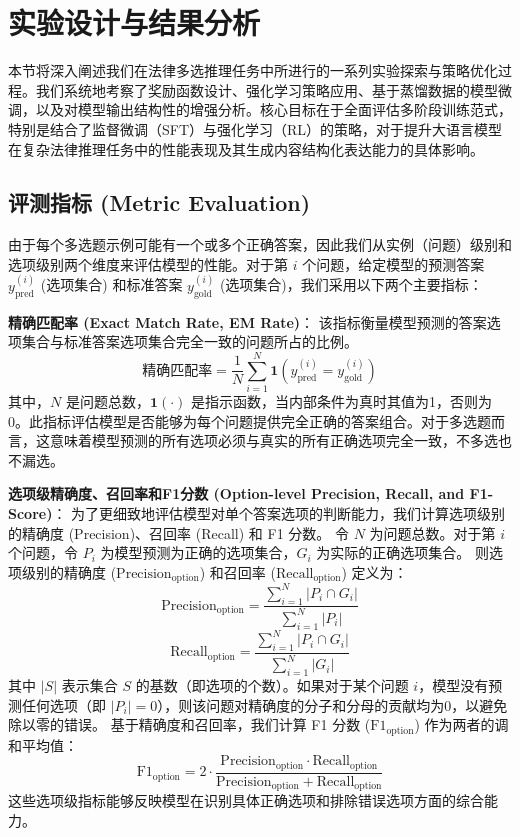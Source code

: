 \documentclass{pkuthesis}
\begin{document}
\section{实验设计与结果分析}
\label{sec:experiments_results}

本节将深入阐述我们在法律多选推理任务中所进行的一系列实验探索与策略优化过程。我们系统地考察了奖励函数设计、强化学习策略应用、基于蒸馏数据的模型微调，以及对模型输出结构性的增强分析。核心目标在于全面评估多阶段训练范式，特别是结合了监督微调（SFT）与强化学习（RL）的策略，对于提升大语言模型在复杂法律推理任务中的性能表现及其生成内容结构化表达能力的具体影响。

\subsection{评测指标 (Metric Evaluation)}
\label{sec:metrics}
由于每个多选题示例可能有一个或多个正确答案，因此我们从实例（问题）级别和选项级别两个维度来评估模型的性能。对于第 $i$ 个问题，给定模型的预测答案 $y^{(i)}_{\text{pred}}$ (选项集合) 和标准答案 $y^{(i)}_{\text{gold}}$ (选项集合)，我们采用以下两个主要指标：

\textbf{精确匹配率 (Exact Match Rate, EM Rate)}：
该指标衡量模型预测的答案选项集合与标准答案选项集合完全一致的问题所占的比例。
$$ \text{精确匹配率} = \frac{1}{N} \sum_{i=1}^{N} \mathbf{1}(y^{(i)}_{\text{pred}} = y^{(i)}_{\text{gold}}) $$
其中，$N$ 是问题总数，$\mathbf{1}(\cdot)$ 是指示函数，当内部条件为真时其值为1，否则为0。此指标评估模型是否能够为每个问题提供完全正确的答案组合。对于多选题而言，这意味着模型预测的所有选项必须与真实的所有正确选项完全一致，不多选也不漏选。

\textbf{选项级精确度、召回率和F1分数 (Option-level Precision, Recall, and F1-Score)}：
为了更细致地评估模型对单个答案选项的判断能力，我们计算选项级别的精确度 (Precision)、召回率 (Recall) 和 F1 分数。
令 $N$ 为问题总数。对于第 $i$ 个问题，令 $P_i$ 为模型预测为正确的选项集合，$G_i$ 为实际的正确选项集合。
则选项级别的精确度 ($\text{Precision}_{\text{option}}$) 和召回率 ($\text{Recall}_{\text{option}}$) 定义为：
$$ \text{Precision}_{\text{option}} = \frac{\sum_{i=1}^N |P_i \cap G_i|}{\sum_{i=1}^N |P_i|} $$
$$ \text{Recall}_{\text{option}} = \frac{\sum_{i=1}^N |P_i \cap G_i|}{\sum_{i=1}^N |G_i|} $$
其中 $|S|$ 表示集合 $S$ 的基数（即选项的个数）。如果对于某个问题 $i$，模型没有预测任何选项（即 $|P_i|=0$），则该问题对精确度的分子和分母的贡献均为0，以避免除以零的错误。
基于精确度和召回率，我们计算 F1 分数 ($\text{F1}_{\text{option}}$) 作为两者的调和平均值：
$$ \text{F1}_{\text{option}} = 2 \cdot \frac{\text{Precision}_{\text{option}} \cdot \text{Recall}_{\text{option}}}{\text{Precision}_{\text{option}} + \text{Recall}_{\text{option}}} $$
这些选项级指标能够反映模型在识别具体正确选项和排除错误选项方面的综合能力。
\end{document}
